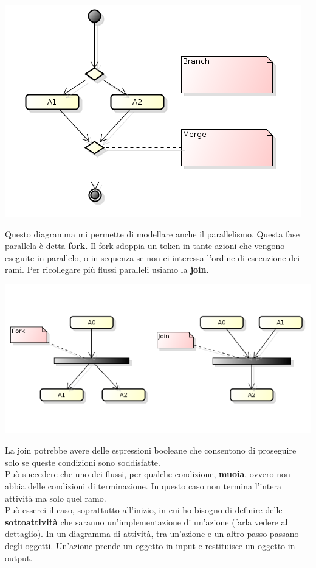 \begin{center}

\includegraphics[width=0.75\columnwidth]{img5} %

\end{center}

Questo diagramma mi permette di modellare anche il parallelismo. Questa fase parallela è detta \textbf{fork}. Il fork sdoppia un token in tante azioni che vengono eseguite in parallelo, o in sequenza se non ci interessa l'ordine di esecuzione dei rami. Per ricollegare più flussi paralleli usiamo la \textbf{join}.

\begin{center}

\includegraphics[width=0.75\columnwidth]{img6} %

\end{center}

La join potrebbe avere delle espressioni booleane che consentono di proseguire solo se queste condizioni sono soddisfatte.\\
Può succedere che uno dei flussi, per qualche condizione, \textbf{muoia}, ovvero non abbia delle condizioni di terminazione. In questo caso non termina l'intera attività ma solo quel ramo.\\
Può esserci il caso, soprattutto all'inizio, in cui ho bisogno di definire delle \textbf{sottoattività} che saranno un'implementazione di un'azione (farla vedere al dettaglio). In un diagramma di attività, tra un'azione e un altro passo passano degli oggetti. Un'azione prende un oggetto in input e restituisce un oggetto in output.

